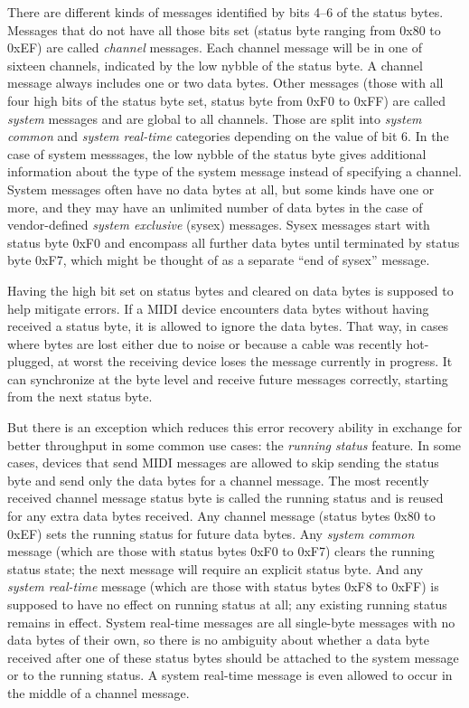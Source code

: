 There are different kinds of messages identified by bits 4--6 of the status
bytes.  Messages that do not have all those bits set (status byte ranging
from 0x80 to 0xEF) are called \emph{channel} messages.  Each channel message
will be in one of sixteen channels, indicated by the low nybble of the
status byte.  A channel message always includes one or two data bytes. 
Other messages (those with all four high bits of the status byte set, status
byte from 0xF0 to 0xFF) are called \emph{system} messages and are global to
all channels.  Those are split into \emph{system common} and \emph{system
real-time} categories depending on the value of bit 6.  In the case of
system messsages, the low nybble of the status byte gives additional
information about the type of the system message instead of specifying a
channel.  System messages often have no data bytes at all, but some kinds
have one or more, and they may have an unlimited number of data bytes in the
case of vendor-defined \emph{system exclusive} (sysex) messages.  Sysex
messages start with status byte 0xF0 and encompass all further data bytes
until terminated by status byte 0xF7, which might be thought of as a
separate ``end of sysex'' message.

Having the high bit set on status bytes and cleared on data bytes is
supposed to help mitigate errors.  If a MIDI device encounters data bytes
without having received a status byte, it is allowed to ignore the data
bytes.  That way, in cases where bytes are lost either due to noise or
because a cable was recently hot-plugged, at worst the receiving device
loses the message currently in progress.  It can synchronize at the byte
level and receive future messages correctly, starting from the next status
byte.

But there is an exception which reduces this error recovery ability in
exchange for better throughput in some common use cases: the \emph{running
status} feature.  In some cases, devices that send MIDI messages are allowed
to skip sending the status byte and send only the data bytes for a channel
message.  The most recently received channel message status byte is called
the running status and is reused for any extra data bytes received.  Any
channel message (status bytes 0x80 to 0xEF) sets the running status for
future data bytes.  Any \emph{system common} message (which are those with
status bytes 0xF0 to 0xF7) clears the running status state; the next message
will require an explicit status byte.  And any \emph{system real-time}
message (which are those with status bytes 0xF8 to 0xFF) is supposed to have
no effect on running status at all; any existing running status remains in
effect.  System real-time messages are all single-byte messages with no data
bytes of their own, so there is no ambiguity about whether a data byte
received after one of these status bytes should be attached to the system
message or to the running status.  A system real-time message is even
allowed to occur in the middle of a channel message.

